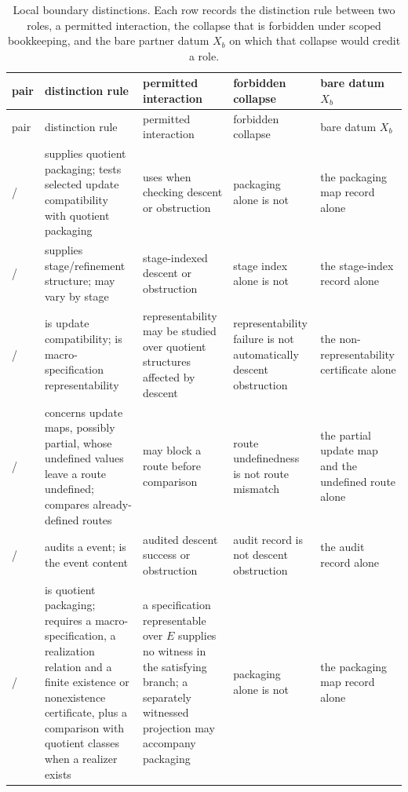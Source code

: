 \begingroup\footnotesize
\setlength{\LTleft}{0pt}\setlength{\LTright}{0pt}
\renewcommand{\arraystretch}{1.15}
\begin{longtable}{@{}>{\raggedright\arraybackslash}p{1.2cm}>{\raggedright\arraybackslash}p{4.3cm}>{\raggedright\arraybackslash}p{3.0cm}>{\raggedright\arraybackslash}p{3.0cm}>{\raggedright\arraybackslash}p{2.9cm}@{}}
\caption{Local boundary distinctions. Each row records the distinction
rule between two roles, a permitted interaction, the collapse that
is forbidden under scoped bookkeeping, and the bare partner datum \(X_b\)
on which that collapse would credit a role.}\label{tab:boundary-matrix}\\
\toprule
pair & distinction rule & permitted interaction & forbidden collapse & bare datum \(X_b\) \\
\midrule
\endfirsthead
\toprule
pair & distinction rule & permitted interaction & forbidden collapse & bare datum \(X_b\) \\
\midrule
\endhead
\bottomrule
\endfoot
\Pone{}/\Pfive{} & \Pfive{} supplies quotient packaging; \Pone{} tests selected update compatibility with quotient packaging & \Pone{} uses \Pfive{} when checking descent or obstruction & packaging alone is not \Pone{} & the \Pfive{} packaging map record alone \\
\Pone{}/\Pfour{} & \Pfour{} supplies stage/refinement structure; \Pone{} may vary by stage & stage-indexed descent or obstruction & stage index alone is not \Pone{} & the \Pfour{} stage-index record alone \\
\Pone{}/\Ptwo{} & \Pone{} is update compatibility; \Ptwo{} is macro-specification representability & representability may be studied over quotient structures affected by descent & representability failure is not automatically descent obstruction & the \Ptwo{} non-representability certificate alone \\
\Pone{}/\Pthree{} & \Pone{} concerns update maps, possibly partial, whose undefined values leave a route undefined; \Pthree{} compares already-defined routes & \Pone{} may block a route before \Pthree{} comparison & route undefinedness is not route mismatch & the partial update map and the undefined route alone \\
\Pone{}/\Psix{} & \Psix{} audits a \Pone{} event; \Pone{} is the event content & audited descent success or obstruction & audit record is not descent obstruction & the \Psix{} audit record alone \\
\Ptwo{}/\Pfive{} & \Pfive{} is quotient packaging; \Ptwo{} requires a macro-specification, a realization relation and a finite existence or nonexistence certificate, plus a comparison with quotient classes when a realizer exists & a specification representable over \(E\) supplies no \Ptwo{} witness in the satisfying branch; a separately witnessed \Ptwo{} projection may accompany \Pfive{} packaging & packaging alone is not \Ptwo{} & the \Pfive{} packaging map record alone \\

\end{longtable}
